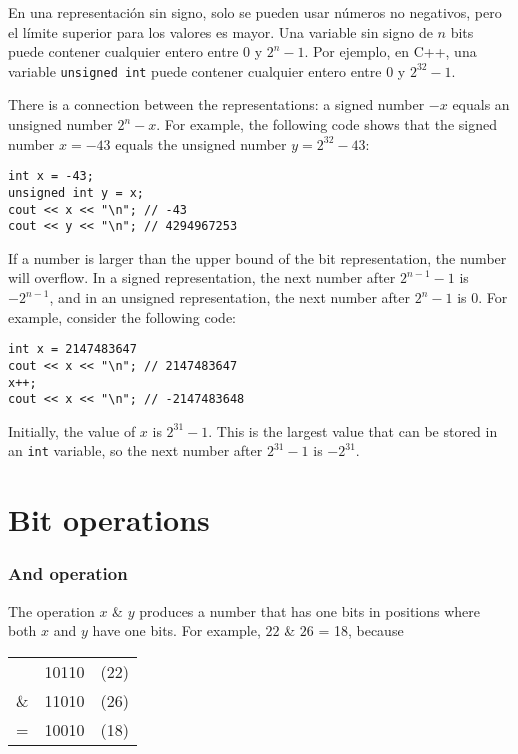 En una representación sin signo, solo se pueden usar
números no negativos, pero el límite superior para los valores es mayor.
Una variable sin signo de $n$ bits puede contener cualquier
entero entre $0$ y $2^n-1$.
Por ejemplo, en C++, una variable \texttt{unsigned int}
puede contener cualquier entero entre $0$ y $2^{32}-1$.

There is a connection between the
representations:
a signed number $-x$ equals an unsigned number $2^n-x$.
For example, the following code shows that
the signed number $x=-43$ equals the unsigned
number $y=2^{32}-43$:
\begin{lstlisting}
int x = -43;
unsigned int y = x;
cout << x << "\n"; // -43
cout << y << "\n"; // 4294967253
\end{lstlisting}

If a number is larger than the upper bound
of the bit representation, the number will overflow.
In a signed representation,
the next number after $2^{n-1}-1$ is $-2^{n-1}$,
and in an unsigned representation,
the next number after $2^n-1$ is $0$.
For example, consider the following code:
\begin{lstlisting}
int x = 2147483647
cout << x << "\n"; // 2147483647
x++;
cout << x << "\n"; // -2147483648
\end{lstlisting}

Initially, the value of $x$ is $2^{31}-1$.
This is the largest value that can be stored
in an \texttt{int} variable,
so the next number after $2^{31}-1$ is $-2^{31}$.


\section{Bit operations}

\newcommand\XOR{\mathbin{\char`\^}}

\subsubsection{And operation}


The  operation $x$ \& $y$ produces a number
that has one bits in positions where both
$x$ and $y$ have one bits.
For example, $22$ \& $26$ = 18, because

\begin{center}
\begin{tabular}{rrr}
& 10110 & (22)\\
\& & 11010 & (26) \\
\hline
 = & 10010 & (18) \\
\end{tabular}
\end{center}

